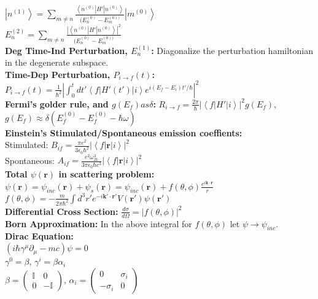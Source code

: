 \documentclass[12pt]{extarticle}
\newcommand{\ket}[1]{\left| #1 \right>}
\newcommand{\bra}[1]{\left< #1 \right|}
\begin{document}
$\ket{n^{(1)}} = \sum\limits_{m\neq n} \frac{\bra{n^{(0)}}H'\ket{n^{(0)}}}{(E_n^{(0)}-E_m^{(0))}} \ket{m^{(0)}}$ \\
$E_n^{(2)} = \sum\limits_{m\neq n} \frac{\left|\bra{n^{(0)}}H'\ket{n^{(0)}}\right|^2}{(E_n^{(0)}-E_m^{(0))}}$ \\
\textbf{Deg Time-Ind Perturbation, $E_n^{(1)}$:} Diagonalize the perturbation hamiltonian in the degenerate subspace. \\
\textbf{Time-Dep Perturbation, $P_{i\rightarrow f}(t)$:} $P_{i\rightarrow f}(t) = \frac{1}{\hbar^2}\left| \int_0^t dt' \bra{f}H'(t')\ket{i} e^{i(E_f-E_i)t'/\hbar}\right|^2$ \\
\textbf{Fermi's golder rule, and $g(E_f) as \delta$:} $R_{i\rightarrow f} = \frac{2\pi}{\hbar}\left|\bra{f}H'\ket{i}\right|^2 g(E_f)$, $g(E_f) \approx \delta(E_f^{(0)}-E_f^{(0)} - \hbar\omega)$ \\
\textbf{Einstein's Stimulated/Spontaneous emission coeffients:} \\
Stimulated: $B_{if} = \frac{\pi e^2}{3\epsilon_0\hbar^2}\left|\bra{f}\mathbf{r}\ket{i}\right|^2$ \\
Spontaneous: $A_{if} = \frac{e^2\omega_{21}^3}{3\pi\epsilon_0\hbar c^3}\left|\bra{f}\mathbf{r}\ket{i}\right|^2$\\
\textbf{Total $\psi(\mathbf{r})$ in scattering problem:} \\
$\psi(\mathbf{r}) = \psi_{inc}(\mathbf{r})+\psi_s(\mathbf{r}) = \psi_{inc}(\mathbf{r}) + f(\theta,\phi)\frac{e^{i\mathbf{k}\cdot\mathbf{r}}}{r}$ \\
$f(\theta,\phi) = -\frac{m}{2\pi\hbar^2} \int d^3r' e^{-i\mathbf{k}'\cdot\mathbf{r}'}V(\mathbf{r}')\psi(\mathbf{r}')$ \\
\textbf{Differential Cross Section:} $\frac{d\sigma}{d\Omega} = \left|f(\theta,\phi)\right|^2$ \\
\textbf{Born Approximation:} In the above integral for $f(\theta,\phi)$ let $\psi \rightarrow \psi_{inc}$. \\
\textbf{Dirac Equation:} \\
$(i\hbar\gamma^\mu\partial_\mu-mc)\psi = 0$ \\
$\gamma^0 = \beta$, $\gamma^i = \beta\alpha_i$ \\
$\beta = \begin{pmatrix} \mathbb{I}&0 \\ 0&-\mathbb{I} \end{pmatrix}$, $\alpha_i = \begin{pmatrix} 0&\sigma_i \\ -\sigma_i&0 \end{pmatrix}$\\
\end{document}
